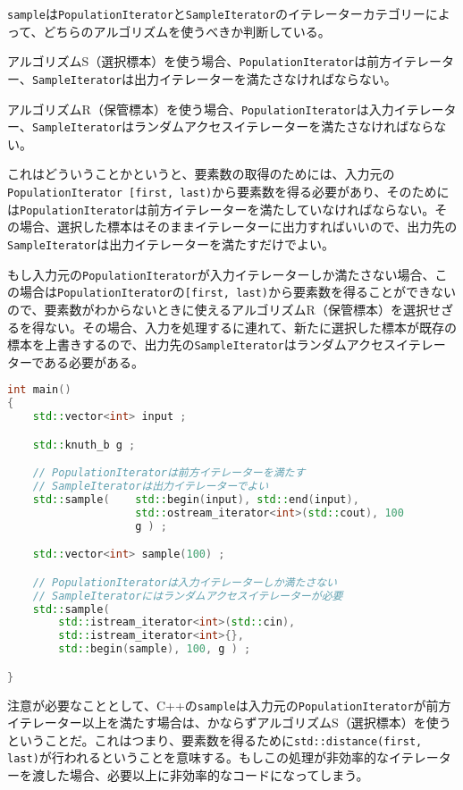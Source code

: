 \lstinline!sample!は\lstinline!PopulationIterator!と\lstinline!SampleIterator!のイテレーターカテゴリーによって、どちらのアルゴリズムを使うべきか判断している。

アルゴリズムS（選択標本）を使う場合、\lstinline!PopulationIterator!は前方イテレーター、\lstinline!SampleIterator!は出力イテレーターを満たさなければならない。

アルゴリズムR（保管標本）を使う場合、\lstinline!PopulationIterator!は入力イテレーター、\lstinline!SampleIterator!はランダムアクセスイテレーターを満たさなければならない。

これはどういうことかというと、要素数の取得のためには、入力元の\lstinline!PopulationIterator [first, last)!から要素数を得る必要があり、そのためには\lstinline!PopulationIterator!は前方イテレーターを満たしていなければならない。その場合、選択した標本はそのままイテレーターに出力すればいいので、出力先の\lstinline!SampleIterator!は出力イテレーターを満たすだけでよい。

もし入力元の\lstinline!PopulationIterator!が入力イテレーターしか満たさない場合、この場合は\lstinline!PopulationIterator!の\lstinline![first, last)!から要素数を得ることができないので、要素数がわからないときに使えるアルゴリズムR（保管標本）を選択せざるを得ない。その場合、入力を処理するに連れて、新たに選択した標本が既存の標本を上書きするので、出力先の\lstinline!SampleIterator!はランダムアクセスイテレーターである必要がある。

\begin{lstlisting}[language=C++]
int main()
{
    std::vector<int> input ;

    std::knuth_b g ;

    // PopulationIteratorは前方イテレーターを満たす
    // SampleIteratorは出力イテレーターでよい
    std::sample(    std::begin(input), std::end(input),
                    std::ostream_iterator<int>(std::cout), 100
                    g ) ;

    std::vector<int> sample(100) ;

    // PopulationIteratorは入力イテレーターしか満たさない
    // SampleIteratorにはランダムアクセスイテレーターが必要
    std::sample(
        std::istream_iterator<int>(std::cin),
        std::istream_iterator<int>{},
        std::begin(sample), 100, g ) ;

}
\end{lstlisting}

注意が必要なこととして、C++の\lstinline!sample!は入力元の\lstinline!PopulationIterator!が前方イテレーター以上を満たす場合は、かならずアルゴリズムS（選択標本）を使うということだ。これはつまり、要素数を得るために\lstinline!std::distance(first, last)!が行われるということを意味する。もしこの処理が非効率的なイテレーターを渡した場合、必要以上に非効率的なコードになってしまう。

